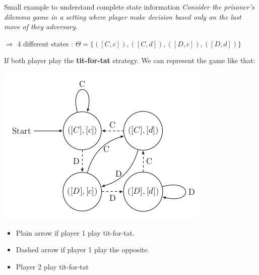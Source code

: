 \begin{frame}{Small example to understand complete state information}
\textit{Consider the prisoner's dilemma game in a setting where player make decision based only on the last move of they adversary.} 

\pause
$\Rightarrow$ 4 different states : $\Theta = \{([C,c]), ([C,d]), ([D,c]), ([D,d])\}$

\pause
If both player play the \textbf{tit-for-tat} strategy. {\color{green} We can represent } the game like that:

\begin{minipage}{0.7\linewidth}
\includegraphics[width=0.9\linewidth]{img/titfortat.png}
\end{minipage}
\begin{minipage}{0.29\linewidth}
	\begin{itemize}
		\item Plain arrow if player 1 play tit-for-tat.
		\item Dashed arrow if player 1 play the opposite.
		\item Player 2 play tit-for-tat
	\end{itemize}
\end{minipage}
\end{frame}

